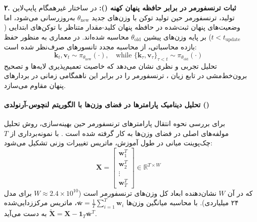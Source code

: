 \textbf{۲. ثبات ترنسفورمر در برابر حافظه پنهان کهنه ():}
در ساختار غیرهمگام پایپ‌لاین تولید، ترنسفورمر حین تولید توکن با وزن‌های جدید $\theta_{\text{new}}$ به‌روزرسانی می‌شود، اما وضعیت‌های پنهان ثبت‌شده در حافظه پنهان کلید-مقدار متناظر با توکن‌های ابتدایی ($t < t_{\text{update}}$) بر پایه وزن‌های پیشین $\theta_{\text{old}}$ محاسبه شده‌اند. در معماری  به منظور حفظ بازده محاسباتی، از محاسبه مجدد تانسورهای  صرف‌نظر شده است:
\begin{equation}
    \mathbf{k}_t, \mathbf{v}_t \sim \pi_{\theta_{\text{new}}}(\cdot), \quad \text{while } \{\mathbf{k}_\tau, \mathbf{v}_\tau\}_{\tau < t} \sim \pi_{\theta_{\text{old}}}(\cdot)
\end{equation}
تحلیل تجربی و نظری نشان می‌دهد که خاصیت تعمیم‌پذیری لایه‌ها و تصحیح برون‌خط‌مشی در تابع زیان  \cite{shao2024deepseekmath, schulman2017proximal}، ترنسفورمر را در برابر این ناهمگامی زمانی در بردارهای پنهان مقاوم می‌سازد.

\paragraph*{تحلیل دینامیک پارامترها در فضای وزن‌ها با الگوریتم لنچوس-آرنولدی ()}
برای بررسی نحوه انتقال پارامترهای ترنسفورمر حین بهینه‌سازی، روش تحلیل مولفه‌های اصلی در فضای وزن‌ها به کار گرفته شده است \cite{li2018visualizing}. با نمونه‌برداری از $T$ چک‌پوینت میانی در طول آموزش، ماتریس تغییرات وزنی تشکیل می‌شود:
\begin{equation}
    \mathbf{X} = \begin{bmatrix} \mathbf{w}_1^T \\ \mathbf{w}_2^T \\ \vdots \\ \mathbf{w}_T^T \end{bmatrix} \in \mathbb{R}^{T \times W}
\end{equation}
که در آن $W$ نشان‌دهنده ابعاد کل وزن‌های ترنسفورمر است ($W \approx 2.4 \times 10^{10}$ برای مدل ۲۴ میلیاردی). با محاسبه میانگین وزن‌ها $\bar{\mathbf{w}} = \frac{1}{T}\sum_{i=1}^T \mathbf{w}_i$، ماتریس مرکززدایی‌شده $\tilde{\mathbf{X}} = \mathbf{X} - \mathbf{1}_T \bar{\mathbf{w}}^T$ به دست می‌آید.

